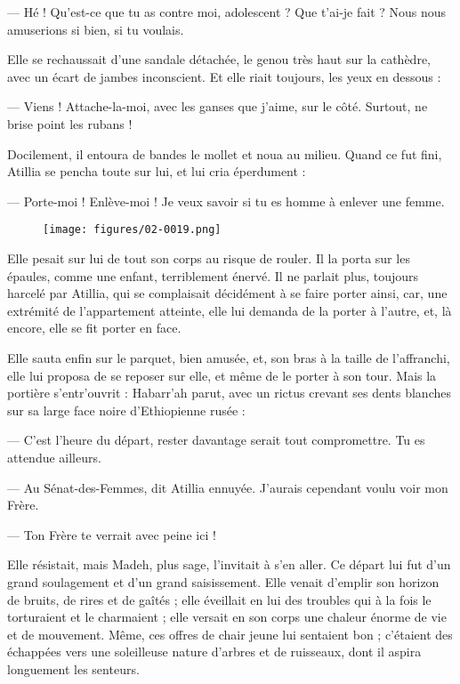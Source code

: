 \documentclass[a4paper, 11pt, oneside, polutonikogreek, french]{article}
\begin{document}
--- Hé ! Qu'est-ce que tu as contre moi, adolescent ? Que t'ai-je fait ? Nous nous amuserions si bien, si tu voulais.

Elle se rechaussait d'une sandale détachée, le genou très haut sur la cathèdre, avec un écart de jambes inconscient. Et elle riait toujours, les yeux en dessous :

--- Viens ! Attache-la-moi, avec les ganses que j'aime, sur le côté. Surtout, ne brise point les rubans !

Docilement, il entoura de bandes le mollet et noua au milieu. Quand ce fut fini, Atillia se pencha toute sur lui, et lui cria éperdument :

--- Porte-moi ! Enlève-moi ! Je veux savoir si tu es homme à enlever une femme.
\begin{figure}[H]
\centering
\texttt{[image: figures/02-0019.png]}
\end{figure}
Elle pesait sur lui de tout son corps au risque de rouler. Il la porta sur les épaules, comme une enfant, terriblement énervé. Il ne parlait plus, toujours harcelé par Atillia, qui se complaisait décidément à se faire porter ainsi, car, une extrémité de l'appartement atteinte, elle lui demanda de la porter à l'autre, et, là encore, elle se fit porter en face.

Elle sauta enfin sur le parquet, bien amusée, et, son bras à la taille de l'affranchi, elle lui proposa de se reposer sur elle, et même de le porter à son tour. Mais la portière s'entr'ouvrit : Habarr'ah parut, avec un rictus crevant ses dents blanches sur sa large face noire d'Ethiopienne rusée :

--- C'est l'heure du départ, rester davantage serait tout compromettre. Tu es attendue ailleurs.

--- Au Sénat-des-Femmes, dit Atillia ennuyée. J'aurais cependant voulu voir mon Frère.

--- Ton Frère te verrait avec peine ici !

Elle résistait, mais Madeh, plus sage, l'invitait à s'en aller. Ce départ lui fut d'un grand soulagement et d'un grand saisissement. Elle venait d'emplir son horizon de bruits, de rires et de gaîtés ; elle éveillait en lui des troubles qui à la fois le torturaient et le charmaient ; elle versait en son corps une chaleur énorme de vie et de mouvement. Même, ces offres de chair jeune lui sentaient bon ; c'étaient des échappées vers une soleilleuse nature d'arbres et de ruisseaux, dont il aspira longuement les senteurs.
\end{document}

